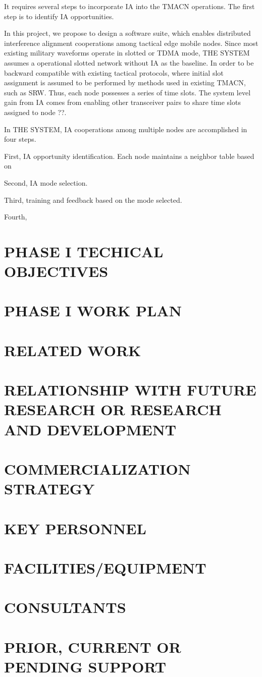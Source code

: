 \documentclass[letterpaper,11pt,onecolumn]{article}
\begin{document}
It requires several steps to incorporate IA into the TMACN operations. The first step is to identify IA opportunities. 

In this project, we propose to design a software suite, which enables distributed interference alignment cooperations among tactical edge mobile nodes.  Since most existing military waveforms operate in slotted or TDMA mode, THE SYSTEM assumes a operational slotted network without IA as the baseline. In order to be backward compatible with existing tactical protocols,  where initial slot assignment is assumed to be performed by methods used in existing TMACN, such as SRW. Thus, each node possesses a series of time slots. The system level gain from IA comes from enabling other transceiver pairs to share time slots assigned to node ??. 

In THE SYSTEM, IA cooperations among multiple nodes are accomplished in four steps. 

First, IA opportunity identification. Each node maintains a neighbor table based on 

Second, IA mode selection.

Third, training and feedback based on the mode selected.

Fourth, 


\section{PHASE I TECHICAL OBJECTIVES}

\section{PHASE I WORK PLAN}

\section{RELATED WORK}

\section{RELATIONSHIP WITH FUTURE RESEARCH OR RESEARCH AND DEVELOPMENT}

\section{COMMERCIALIZATION STRATEGY}

\section{KEY PERSONNEL}

\section{FACILITIES/EQUIPMENT}

\section{CONSULTANTS}

\section{PRIOR, CURRENT OR PENDING SUPPORT}
\end{document}
